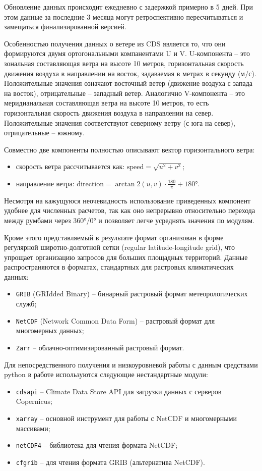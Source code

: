 Обновление данных происходит ежедневно с задержкой примерно в 5 дней.
При этом данные за последние 3 месяца могут ретроспективно пересчитываться и замещаться финализированной версией.

Особенностью получения данных о ветере из CDS является то, что они формируются двумя ортогональными компанентами U и V.
U-компонента -- это зональная составляющая ветра на высоте 10 метров, горизонтальная скорость движения воздуха в направлении на восток, задаваемая в метрах в секунду (м/с). 
Положительные значения означают восточный ветер (движение воздуха с запада на восток), отрицательные -- западный ветер.
Аналогично V-компонента -- это меридианальная составляющая ветра на высоте 10 метров, то есть горизонтальная скорость движения воздуха в направлении на север. Положительные значения соответствуют северному ветру (с юга на север), отрицательные -- южному.

Совместно две компоненты полностью описывают вектор горизонтального ветра:
\begin{itemize}
    \item скорость ветра рассчитывается как: $\text{speed} = \sqrt{u^2 + v^2}$;
    \item направление ветра: $\text{direction} = \arctan2(u, v) \cdot \frac{180}{\pi} + 180°$.
\end{itemize}

Несмотря на кажущуюся неочевидность использование приведенных компонент удобнее для численных расчетов, так как оно непрерывно относительно перехода между румбами через 360°/0° и позволяет легче усреднять значения по модулям.

Кроме этого представляемый в результате формат организован в форме регулярной широтно-долготной сетки (regular latitude-longitude grid), что упрощает организацию запросов для больших площадных территорий.
Данные распространяются в форматах, стандартных для растровых климатических данных:
\begin{itemize}
    \item \texttt{GRIB} (GRIdded Binary) -- бинарный растровый формат метеорологических служб;
    \item \texttt{NetCDF} (Network Common Data Form) -- растровый формат для многомерных данных;
    \item \texttt{Zarr} -- облачно-оптимизированный растровый формат.
\end{itemize}

Для непосредственного получения и низкоуровневой работы с данным средствами python в работе используются следующие нестандартные модули:
\begin{itemize}
    \item \texttt{cdsapi} -- Climate Data Store API для загрузки данных с серверов Copernicus;
    \item \texttt{xarray} -- основной инструмент для работы с NetCDF и многомерными массивами;
    \item \texttt{netCDF4} -- библиотека для чтения формата NetCDF;
    \item \texttt{cfgrib} -- для чтения формата GRIB (альтернатива NetCDF).
\end{itemize}


